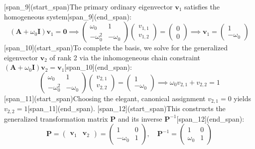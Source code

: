 \documentclass[12pt,letterpaper]{article}
\theoremstyle{definition}
\begin{document}
[span_9](start_span)The primary ordinary eigenvector $\mathbf{v}_{1}$ satisfies the homogeneous system[span_9](end_span):
\begin{equation}
    (\mathbf{A} + \omega_{0}\mathbf{I})\mathbf{v}_{1} = \mathbf{0} \implies \begin{pmatrix} \omega_{0} & 1 \\ -\omega_{0}^{2} & -\omega_{0} \end{pmatrix} \begin{pmatrix} v_{1,1} \\ v_{1,2} \end{pmatrix} = \begin{pmatrix} 0 \\ 0 \end{pmatrix} \implies \mathbf{v}_{1} = \begin{pmatrix} 1 \\ -\omega_{0} \end{pmatrix}
\end{equation}
[span_10](start_span)To complete the basis, we solve for the generalized eigenvector $\mathbf{v}_{2}$ of rank 2 via the inhomogeneous chain constraint $(\mathbf{A} + \omega_{0}\mathbf{I})\mathbf{v}_{2} = \mathbf{v}_{1}$[span_10](end_span):
\begin{equation}
    \begin{pmatrix} \omega_{0} & 1 \\ -\omega_{0}^{2} & -\omega_{0} \end{pmatrix} \begin{pmatrix} v_{2,1} \\ v_{2,2} \end{pmatrix} = \begin{pmatrix} 1 \\ -\omega_{0} \end{pmatrix} \implies \omega_{0}v_{2,1} + v_{2,2} = 1
\end{equation}
[span_11](start_span)Choosing the elegant, canonical assignment $v_{2,1} = 0$ yields $v_{2,2} = 1$[span_11](end_span). [span_12](start_span)This constructs the generalized transformation matrix $\mathbf{P}$ and its inverse $\mathbf{P}^{-1}$[span_12](end_span):
\begin{equation}
    \mathbf{P} = \begin{pmatrix} \mathbf{v}_{1} & \mathbf{v}_{2} \end{pmatrix} = \begin{pmatrix} 1 & 0 \\ -\omega_{0} & 1 \end{pmatrix}, \quad \mathbf{P}^{-1} = \begin{pmatrix} 1 & 0 \\ \omega_{0} & 1 \end{pmatrix}
\end{equation}
\end{document}

